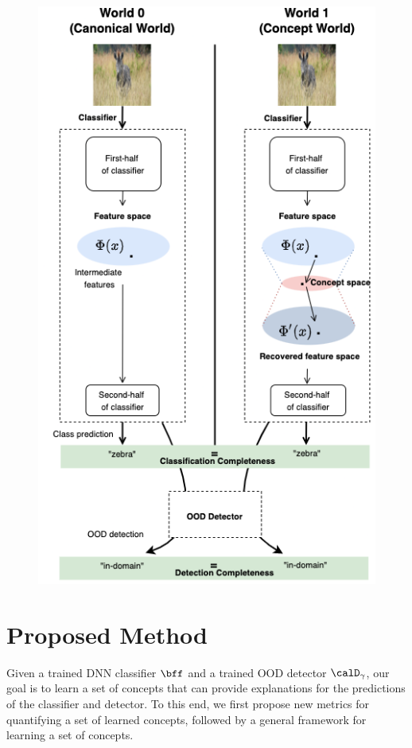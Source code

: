 \begin{figure}[htb]
\vspace{1mm}
\centering
\includegraphics[scale=0.35]{figures/completeness.png}
\caption{\small {}}
\vspace{-5mm}
\label{fig:detection-completeness}
\end{figure}

\section{Proposed Method}
Given a trained DNN classifier $\bff$ and a trained OOD detector $\calD_\gamma$, our goal is to learn a set of concepts that can provide explanations for the predictions of the classifier and detector.
To this end, we first propose new metrics for quantifying a set of learned concepts, followed by a general framework for learning a set of concepts.


